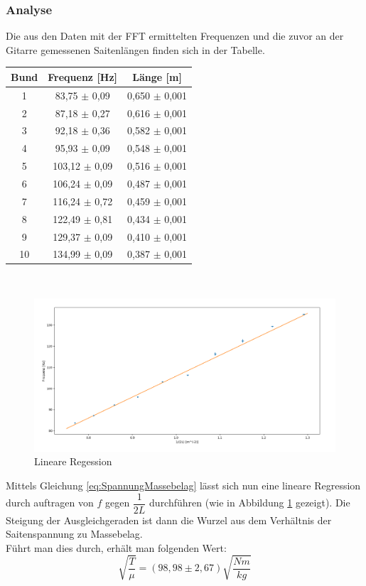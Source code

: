 \documentclass[12pt,a4paper]{article}
\begin{document}
\subsubsection{Analyse}
Die aus den Daten mit der FFT ermittelten Frequenzen und die zuvor an der Gitarre gemessenen Saitenlängen finden sich in der Tabelle. \\
\begin{tabular}{|c|c|c|}
\hline 
Bund & Frequenz [Hz] & Länge [m] \\ 
\hline 
1 & 83,75 $\pm$ 0,09 & 0,650 $\pm$ 0,001 \\ 
\hline 
2 & 87,18 $\pm$ 0,27 & 0,616 $\pm$ 0,001 \\ 
\hline 
3 & 92,18 $\pm$ 0,36 & 0,582 $\pm$ 0,001 \\ 
\hline 
4 & 95,93 $\pm$ 0,09 & 0,548 $\pm$ 0,001 \\ 
\hline 
5 & 103,12 $\pm$ 0,09 & 0,516 $\pm$ 0,001 \\ 
\hline 
6 & 106,24 $\pm$ 0,09 & 0,487 $\pm$ 0,001 \\ 
\hline 
7 & 116,24 $\pm$ 0,72 & 0,459 $\pm$ 0,001 \\ 
\hline 
8 & 122,49 $\pm$ 0,81 & 0,434 $\pm$ 0,001 \\ 
\hline 
9 & 129,37 $\pm$ 0,09 & 0,410 $\pm$ 0,001 \\ 
\hline 
10 & 134,99 $\pm$ 0,09 & 0,387 $\pm$ 0,001 \\ 
\hline 
\end{tabular} 
\\
\begin{figure}
\includegraphics[scale=0.5]{Bilder/SpannungMassebelagLineareRegression.png}
\centering
\caption{Lineare Regession}
\label{LineareRegressionSpannungMassebelag}
\end{figure}
Mittels Gleichung \ref{eq:SpannungMassebelag} lässt sich nun eine lineare Regression durch auftragen von $f$ gegen $\dfrac{1}{2L}$ durchführen (wie in Abbildung \ref{LineareRegressionSpannungMassebelag} gezeigt). Die Steigung der Ausgleichgeraden ist dann die Wurzel aus dem Verhältnis der Saitenspannung zu Massebelag. \\
Führt man dies durch, erhält man folgenden Wert:
\begin{equation}
\sqrt{\dfrac{T}{\mu}} = (98,98 \pm 2,67)\sqrt{\dfrac{Nm}{kg}}
\end{equation}
\end{document}
